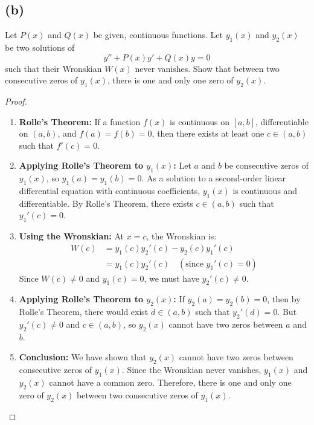 \documentclass{article}
\begin{document}
\subsection*{(b)}
Let $P(x)$ and $Q(x)$ be given, continuous functions. Let $y_1(x)$ and $y_2(x)$ be two solutions of 
\[y'' + P(x)y' + Q(x)y = 0\]
such that their Wronskian $W(x)$ never vanishes. Show that between two consecutive zeros of $y_1(x)$, there is one and only one zero of $y_2(x)$.
\begin{proof}
\begin{enumerate}
\item \textbf{Rolle's Theorem:}
If a function $f(x)$ is continuous on $[a, b]$, differentiable on $(a, b)$, and $f(a) = f(b) = 0$, then there exists at least one $c \in (a, b)$ such that $f'(c) = 0$.
\item \textbf{Applying Rolle's Theorem to $y_1(x)$:}
Let $a$ and $b$ be consecutive zeros of $y_1(x)$, so $y_1(a) = y_1(b) = 0$.  As a solution to a second-order linear differential equation with continuous coefficients, $y_1(x)$ is continuous and differentiable. By Rolle's Theorem, there exists $c \in (a, b)$ such that $y_1'(c) = 0$.
\item \textbf{Using the Wronskian:}
At $x = c$, the Wronskian is:
\begin{align*}
W(c) &= y_1(c)y_2'(c) - y_2(c)y_1'(c) \\
&= y_1(c)y_2'(c) \quad (\text{since } y_1'(c) = 0)
\end{align*}
Since $W(c) \neq 0$ and $y_1(c) = 0$, we must have $y_2'(c) \neq 0$.
\item \textbf{Applying Rolle's Theorem to $y_2(x)$:}
If $y_2(a) = y_2(b) = 0$, then by Rolle's Theorem, there would exist $d \in (a, b)$ such that $y_2'(d) = 0$. But $y_2'(c) \neq 0$ and $c \in (a, b)$, so $y_2(x)$ cannot have two zeros between $a$ and $b$.
\item \textbf{Conclusion:}
We have shown that $y_2(x)$ cannot have two zeros between consecutive zeros of $y_1(x)$. Since the Wronskian never vanishes, $y_1(x)$ and $y_2(x)$ cannot have a common zero.  Therefore, there is one and only one zero of $y_2(x)$ between two consecutive zeros of $y_1(x)$.
\end{enumerate}
\end{proof}
\end{document}
